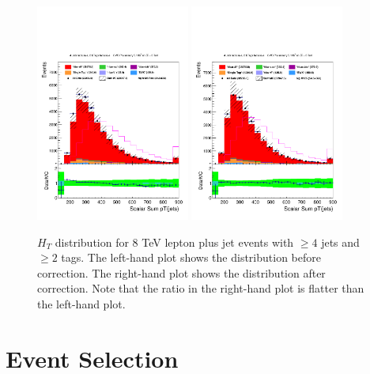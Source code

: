 \begin{figure}[hbtp]
 \begin{center}
   \includegraphics[width=0.45\textwidth]{Figures/Analysis_1_Diagrams/d2MCPlots_Ht_cut0_4JIncl_2TIncl_Combined.pdf}
   \includegraphics[width=0.45\textwidth]{Figures/Analysis_1_Diagrams/d2MCPlots_Ht_cut0_4JIncl_2TIncl_Combined_HtWgt.pdf}
   \caption{$H_{T}$ distribution for 8 TeV lepton plus jet events with
   $\geq 4$ jets and $\geq 2$ tags. The left-hand plot shows the
   distribution before correction. The right-hand plot shows the
   distribution after correction. Note that the ratio in the right-hand
   plot is flatter than the left-hand plot.}
   \label{fig:HTBeforeAfter}
   \end{center}
\end{figure}




\section{Event Selection}
\label{event_selection_overview}

